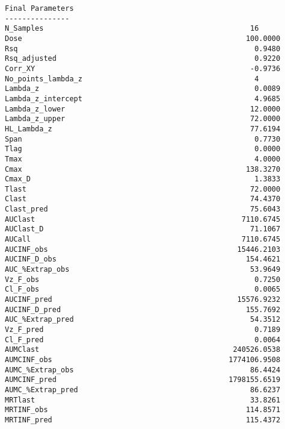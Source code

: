 \documentclass[12pt,a4paper]{article}
\begin{document}
\begin{verbatim}
Final Parameters
---------------
N_Samples                                                16
Dose                                                    100.0000
Rsq                                                       0.9480
Rsq_adjusted                                              0.9220
Corr_XY                                                  -0.9736
No_points_lambda_z                                        4
Lambda_z                                                  0.0089
Lambda_z_intercept                                        4.9685
Lambda_z_lower                                           12.0000
Lambda_z_upper                                           72.0000
HL_Lambda_z                                              77.6194
Span                                                      0.7730
Tlag                                                      0.0000
Tmax                                                      4.0000
Cmax                                                    138.3270
Cmax_D                                                    1.3833
Tlast                                                    72.0000
Clast                                                    74.4370
Clast_pred                                               75.6043
AUClast                                                7110.6745
AUClast_D                                                71.1067
AUCall                                                 7110.6745
AUCINF_obs                                            15446.2103
AUCINF_D_obs                                            154.4621
AUC_%Extrap_obs                                          53.9649
Vz_F_obs                                                  0.7250
Cl_F_obs                                                  0.0065
AUCINF_pred                                           15576.9232
AUCINF_D_pred                                           155.7692
AUC_%Extrap_pred                                         54.3512
Vz_F_pred                                                 0.7189
Cl_F_pred                                                 0.0064
AUMClast                                             240526.0538
AUMCINF_obs                                         1774106.9508
AUMC_%Extrap_obs                                         86.4424
AUMCINF_pred                                        1798155.6519
AUMC_%Extrap_pred                                        86.6237
MRTlast                                                  33.8261
MRTINF_obs                                              114.8571
MRTINF_pred                                             115.4372




\end{verbatim}
\end{document}
